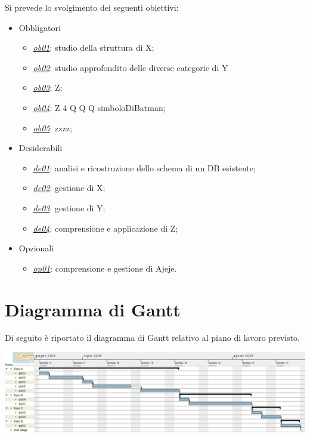 \documentclass[11pt,notitlepage]{article}
\begin{document}
\bigskip
\bigskip
\noindent
Si prevede lo svolgimento dei seguenti obiettivi:
\begin{itemize}
	\item Obbligatori
	\begin{itemize}
		\item \underline{\textit{ob01}}: studio della struttura di X;
		\item \underline{\textit{ob02}}: studio approfondito delle diverse categorie di Y
		\item \underline{\textit{ob03}}: Z;
		\item \underline{\textit{ob04}}: Z 4 Q Q Q simboloDiBatman;
		\item \underline{\textit{ob05}}: zzzz;
	\end{itemize}
	
	\item Desiderabili 
	\begin{itemize}
		\item \underline{\textit{de01}}: analisi e ricostruzione dello schema di un DB esistente;
		\item \underline{\textit{de02}}: gestione di X;
		\item \underline{\textit{de03}}: gestione di Y;
		\item \underline{\textit{de04}}: comprensione e applicazione di Z;
	\end{itemize}
	
	\item Opzionali
	\begin{itemize}
		\item \underline{\textit{op01}}: comprensione e gestione di Ajeje.
	\end{itemize} 
\end{itemize}


\section*{Diagramma di Gantt}
Di seguito è riportato il diagramma di Gantt relativo al piano di lavoro previsto.
\begin{center}
	\includegraphics[scale=0.42]{immagini/gantt.png}
\end{center}
\end{document}
